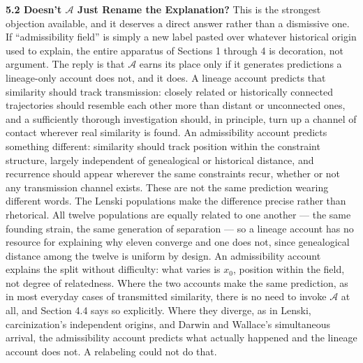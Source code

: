 \documentclass[11pt]{article}
\theoremstyle{plain}
\begin{document}
\textbf{5.2 Doesn't \(\mathcal{A}\) Just Rename the Explanation?} This is the strongest objection available, and it deserves a direct answer rather than a dismissive one. If ``admissibility field'' is simply a new label pasted over whatever historical origin used to explain, the entire apparatus of Sections 1 through 4 is decoration, not argument. The reply is that \(\mathcal{A}\) earns its place only if it generates predictions a lineage-only account does not, and it does. A lineage account predicts that similarity should track transmission: closely related or historically connected trajectories should resemble each other more than distant or unconnected ones, and a sufficiently thorough investigation should, in principle, turn up a channel of contact wherever real similarity is found. An admissibility account predicts something different: similarity should track position within the constraint structure, largely independent of genealogical or historical distance, and recurrence should appear wherever the same constraints recur, whether or not any transmission channel exists. These are not the same prediction wearing different words. The Lenski populations make the difference precise rather than rhetorical. All twelve populations are equally related to one another --- the same founding strain, the same generation of separation --- so a lineage account has no resource for explaining why eleven converge and one does not, since genealogical distance among the twelve is uniform by design. An admissibility account explains the split without difficulty: what varies is \(x_0\), position within the field, not degree of relatedness. Where the two accounts make the same prediction, as in most everyday cases of transmitted similarity, there is no need to invoke \(\mathcal{A}\) at all, and Section 4.4 says so explicitly. Where they diverge, as in Lenski, carcinization's independent origins, and Darwin and Wallace's simultaneous arrival, the admissibility account predicts what actually happened and the lineage account does not. A relabeling could not do that.
\end{document}

